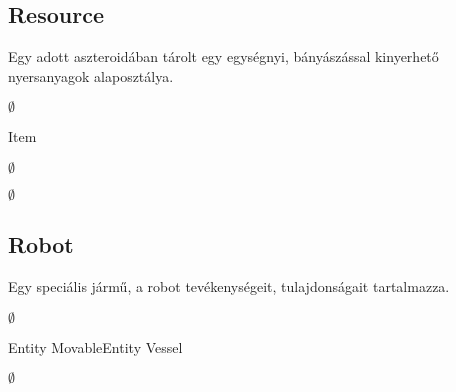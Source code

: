 \documentclass[../../projlab]{subfiles}
\begin{document}
\subsection{Resource}
\begin{class-template-responsibility}
Egy adott aszteroidában tárolt egy egységnyi, bányászással kinyerhető nyersanyagok alaposztálya. 
\end{class-template-responsibility}
\begin{class-template-interface}
$\emptyset$
\end{class-template-interface}
\begin{class-template-baseclass}
Item
\end{class-template-baseclass}
\begin{class-template-attribute}
\item[] $\emptyset$
\end{class-template-attribute}
\begin{class-template-method}
\item[] $\emptyset$
\end{class-template-method}

\subsection{Robot}
\begin{class-template-responsibility}
Egy speciális jármű, a robot tevékenységeit, tulajdonságait tartalmazza.
\end{class-template-responsibility}
\begin{class-template-interface}
$\emptyset$
\end{class-template-interface}
\begin{class-template-baseclass}
Entity \baseclass MovableEntity \baseclass Vessel
\end{class-template-baseclass}
\begin{class-template-attribute}
\item[] $\emptyset$
\end{class-template-attribute}
\begin{class-template-method}
\end{class-template-method}
\end{document}

